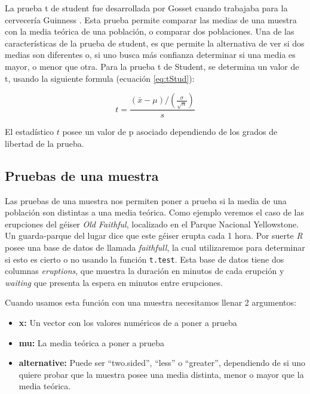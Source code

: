 \documentclass[]{book}
\providecommand{\tightlist}{%
  \setlength{\itemsep}{0pt}\setlength{\parskip}{0pt}}
\begin{document}
La prueba t de student fue desarrollada por Gosset cuando trabajaba para la cervecería Guinness \citep{student1908probable}. Esta prueba permite comparar las medias de una muestra con la media teórica de una población, o comparar dos poblaciones. Una de las características de la prueba de student, es que permite la alternativa de ver si dos medias son diferentes o, si uno busca más confianza determinar si una media es mayor, o menor que otra. Para la prueba t de Student, se determina un valor de t, usando la siguiente formula (ecuación \eqref{eq:tStud}):

\begin{equation} 
  t = \frac{(\bar{x} - \mu)/(\frac{\sigma}{\sqrt{n}})}{s}
  \label{eq:tStud}
\end{equation}

El estadístico \(t\) posee un valor de p asociado dependiendo de los grados de libertad de la prueba.

\hypertarget{pruebas-de-una-muestra}{%
\subsection{Pruebas de una muestra}\label{pruebas-de-una-muestra}}

Las pruebas de una muestra nos permiten poner a prueba si la media de una población son distintas a una media teórica. Como ejemplo veremos el caso de las erupciones del géiser \emph{Old Faithful}, localizado en el Parque Nacional Yellowstone. Un guarda-parque del lugar dice que este géiser erupta cada 1 hora. Por suerte \emph{R} posee una base de datos de \citet{azzalini1990look} llamada \emph{faithfull}, la cual utilizaremos para determinar si esto es cierto o no usando la función \texttt{t.test}. Esta base de datos tiene dos columnas \emph{eruptions}, que muestra la duración en minutos de cada erupción y \emph{waiting} que presenta la espera en minutos entre erupciones.

Cuando usamos esta función con una muestra necesitamos llenar 2 argumentos:

\begin{itemize}
\tightlist
\item
  \textbf{x:} Un vector con los valores numéricos de a poner a prueba
\item
  \textbf{mu:} La media teórica a poner a prueba
\item
  \textbf{alternative:} Puede ser ``two.sided'', ``less'' o ``greater'', dependiendo de si uno quiere probar que la muestra posee una media distinta, menor o mayor que la media teórica.
\end{itemize}
\end{document}
